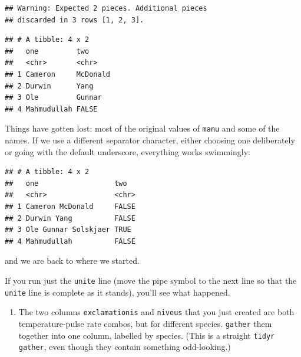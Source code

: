 \documentclass[]{tufte-book}
\newenvironment{Shaded}{}{}
\newcommand{\DataTypeTok}[1]{\textcolor[rgb]{0.56,0.13,0.00}{#1}}
\newcommand{\KeywordTok}[1]{\textcolor[rgb]{0.00,0.44,0.13}{\textbf{#1}}}
\newcommand{\NormalTok}[1]{#1}
\newcommand{\OperatorTok}[1]{\textcolor[rgb]{0.40,0.40,0.40}{#1}}
\newcommand{\StringTok}[1]{\textcolor[rgb]{0.25,0.44,0.63}{#1}}
\providecommand{\tightlist}{%
  \setlength{\itemsep}{0pt}\setlength{\parskip}{0pt}}
\theoremstyle{definition}
\theoremstyle{definition}
\theoremstyle{definition}
\theoremstyle{remark}
\begin{document}
\begin{verbatim}
## Warning: Expected 2 pieces. Additional pieces
## discarded in 3 rows [1, 2, 3].
\end{verbatim}

\begin{verbatim}
## # A tibble: 4 x 2
##   one         two     
##   <chr>       <chr>   
## 1 Cameron     McDonald
## 2 Durwin      Yang    
## 3 Ole         Gunnar  
## 4 Mahmudullah FALSE
\end{verbatim}

Things have gotten lost: most of the original values of \texttt{manu}
and some of the names. If we use a different separator character, either
choosing one deliberately or going with the default underscore,
everything works swimmingly:

\begin{Shaded}
\end{Shaded}

\begin{verbatim}
## # A tibble: 4 x 2
##   one                  two  
##   <chr>                <chr>
## 1 Cameron McDonald     FALSE
## 2 Durwin Yang          FALSE
## 3 Ole Gunnar Solskjaer TRUE 
## 4 Mahmudullah          FALSE
\end{verbatim}

and we are back to where we started.

If you run just the \texttt{unite} line (move the pipe symbol to the
next line so that the \texttt{unite} line is complete as it stands),
you'll see what happened.

\begin{enumerate}
\def\labelenumi{(\alph{enumi})}
\setcounter{enumi}{2}
\tightlist
\item
  The two columns \texttt{exclamationis} and \texttt{niveus} that you
  just created are both temperature-pulse rate combos, but for different
  species. \texttt{gather} them together into one column, labelled by
  species. (This is a straight \texttt{tidyr} \texttt{gather}, even
  though they contain something odd-looking.)
\end{enumerate}
\end{document}
